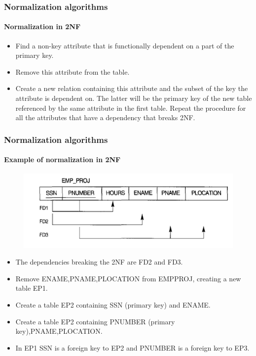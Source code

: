 \documentclass{beamer}
\begin{document}
\begin{frame}
	\frametitle{Normalization algorithms}
	\framesubtitle{Normalization in 2NF}
	
	\begin{itemize}
		\item Find a non-key attribute that is functionally dependent on a part of the primary key.
		\item Remove this attribute from the table.
		\item Create a new relation containing this attribute and the subset of the key the attribute is dependent on. The latter will be the primary key of the new table referenced by the same attribute in the first table.
		Repeat the procedure for all the attributes that have a dependency that breaks 2NF.		
	\end{itemize}
\end{frame}

\begin{frame}
	\frametitle{Normalization algorithms}
	\framesubtitle{Example of normalization in 2NF}
	
	\begin{figure}
		\includegraphics[scale=0.5]{img/normalization/norm15}
	\end{figure}
	
	\begin{itemize}
		\item The dependencies breaking the 2NF are FD2 and FD3.
		\item Remove ENAME,PNAME,PLOCATION from EMP\textunderscore PROJ, creating a new table EP1.
		\item Create a table EP2 containing SSN (primary key) and ENAME.
		\item Create a table EP2 containing PNUMBER (primary key),PNAME,PLOCATION.
		\item In EP1 SSN is a foreign key to EP2 and PNUMBER is a foreign key to EP3.		
	\end{itemize}
\end{frame}
\end{document}
